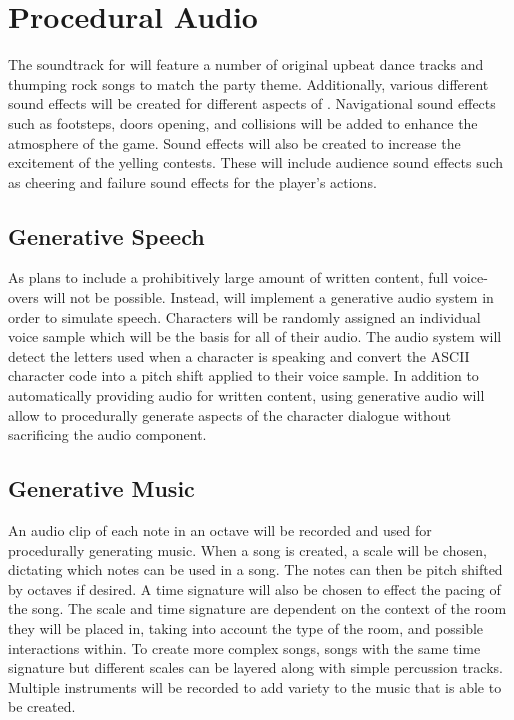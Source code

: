 \section{Procedural Audio}

The soundtrack for \ourgame{} will feature a number of original upbeat dance tracks and thumping rock songs to match the party theme. Additionally, various different sound effects will be created for different aspects of \ourgame{}. Navigational sound effects such as footsteps, doors opening, and collisions will be added to enhance the atmosphere of the game. Sound effects will also be created to increase the excitement of the yelling contests. These will include audience sound effects such as cheering and failure sound effects for the player's actions. 

\subsection{Generative Speech}
As \ourteam{} plans to include a prohibitively large amount of written content, full voice-overs will not be possible. Instead, \ourgame{} will implement a generative audio system in order to simulate speech. Characters will be randomly assigned an individual voice sample which will be the basis for all of their audio. The audio system will detect the letters used when a character is speaking and convert the ASCII character code into a pitch shift applied to their voice sample. In addition to automatically providing audio for written content, using generative audio will allow \ourteam{} to procedurally generate aspects of the character dialogue without sacrificing the audio component.

\subsection{Generative Music}\label{sec:audio_generation}An audio clip of each note in an octave will be recorded and used for procedurally generating music. When a song is created, a scale will be chosen, dictating which notes can  be used in a song. The notes can then be pitch shifted by octaves if desired. A time signature will also be chosen to effect the pacing of the song. The scale and time signature are dependent on the context of the room they will be placed in, taking into account the type of the room, and possible interactions within. To create more complex songs, songs with the same time signature but different scales can be layered along with simple percussion tracks. Multiple instruments will be recorded to add variety to the music that is able to be created.